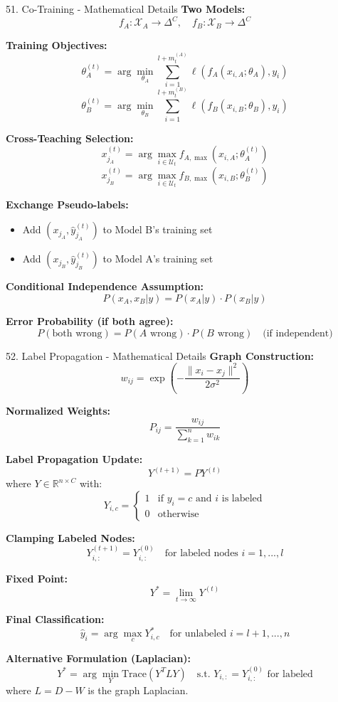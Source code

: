 \documentclass[8pt]{beamer}
\begin{document}
	\begin{frame}{51. Co-Training - Mathematical Details}
		\fontsize{6.5}{7.5}\selectfont
		\textbf{Two Models:}
		\[
		f_A: \mathcal{X}_A \rightarrow \Delta^C, \quad f_B: \mathcal{X}_B \rightarrow \Delta^C
		\]
		
		\textbf{Training Objectives:}
		\[
		\theta_A^{(t)} = \arg\min_{\theta_A} \sum_{i=1}^{l + m_t^{(A)}} \ell(f_A(x_{i,A}; \theta_A), y_i)
		\]
		\[
		\theta_B^{(t)} = \arg\min_{\theta_B} \sum_{i=1}^{l + m_t^{(B)}} \ell(f_B(x_{i,B}; \theta_B), y_i)
		\]
		
		\textbf{Cross-Teaching Selection:}
		\[
		x_{j_A}^{(t)} = \arg\max_{i \in \mathcal{U}_t} f_{A,\max}(x_{i,A}; \theta_A^{(t)})
		\]
		\[
		x_{j_B}^{(t)} = \arg\max_{i \in \mathcal{U}_t} f_{B,\max}(x_{i,B}; \theta_B^{(t)})
		\]
		
		\textbf{Exchange Pseudo-labels:}
		\begin{itemize}
			\item Add $(x_{j_A}, \hat{y}_{j_A}^{(t)})$ to Model B's training set
			\item Add $(x_{j_B}, \hat{y}_{j_B}^{(t)})$ to Model A's training set
		\end{itemize}
		
		\textbf{Conditional Independence Assumption:}
		\[
		P(x_A, x_B | y) = P(x_A | y) \cdot P(x_B | y)
		\]
		
		\textbf{Error Probability (if both agree):}
		\[
		P(\text{both wrong}) = P(A\text{ wrong}) \cdot P(B\text{ wrong}) \quad \text{(if independent)}
		\]
	\end{frame}
	
	\begin{frame}{52. Label Propagation - Mathematical Details}
		\fontsize{6.5}{7.5}\selectfont
		\textbf{Graph Construction:}
		\[
		w_{ij} = \exp\left(-\frac{\|x_i - x_j\|^2}{2\sigma^2}\right)
		\]
		
		\textbf{Normalized Weights:}
		\[
		P_{ij} = \frac{w_{ij}}{\sum_{k=1}^n w_{ik}}
		\]
		
		\textbf{Label Propagation Update:}
		\[
		Y^{(t+1)} = P Y^{(t)}
		\]
		where $Y \in \mathbb{R}^{n \times C}$ with:
		\[
		Y_{i,c} = 
		\begin{cases}
			1 & \text{if } y_i = c \text{ and } i \text{ is labeled} \\
			0 & \text{otherwise}
		\end{cases}
		\]
		
		\textbf{Clamping Labeled Nodes:}
		\[
		Y_{i,:}^{(t+1)} = Y_{i,:}^{(0)} \quad \text{for labeled nodes } i = 1,...,l
		\]
		
		\textbf{Fixed Point:}
		\[
		Y^* = \lim_{t \to \infty} Y^{(t)}
		\]
		
		\textbf{Final Classification:}
		\[
		\hat{y}_i = \arg\max_c Y_{i,c}^* \quad \text{for unlabeled } i = l+1,...,n
		\]
		
		\textbf{Alternative Formulation (Laplacian):}
		\[
		Y^* = \arg\min_Y \text{Trace}(Y^T L Y) \quad \text{s.t. } Y_{i,:} = Y_{i,:}^{(0)} \text{ for labeled}
		\]
		where $L = D - W$ is the graph Laplacian.
	\end{frame}
	
\end{document}
